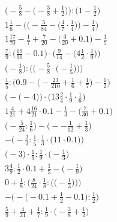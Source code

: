 \documentclass[8pt]{article}
\begin{document}
\begin{align}
\Big(-\frac{5}{8} - \big(-\frac{3}{8} + \frac{1}{2}\big)\Big) : \Big(1 - \frac{1}{2}\Big) \\
1\frac{1}{6} - \bigg(\Big(-\frac{5}{84} - \big(\frac{4}{7} \cdot \frac{1}{4}\big)\Big) - \frac{1}{4}\bigg) \\
1\frac{17}{70} - \frac{1}{7} + \frac{7}{20} - \big(\frac{3}{20} + 0.1\big) - \frac{1}{5} \\
\frac{7}{9} : \Big(\frac{19}{90} - 0.1\Big) \cdot \Big(\frac{9}{14} - \big(4\frac{1}{2} \cdot \frac{1}{9}\big)\Big) \\
\bigg(-\frac{1}{8}\bigg) : \bigg(\Big(-\frac{5}{8} \cdot \big(-\frac{1}{5}\big)\Big)\bigg) \\
\frac{1}{5} : \Big(0.9 - \big(-\frac{23}{210} + \frac{1}{6} + \frac{1}{7}\big) - \frac{1}{2}\Big) \\
\Big(-\big(-4\big)\Big) \cdot \Big(13\frac{2}{4} \cdot \frac{1}{9} \cdot \frac{1}{6}\Big) \\
1\frac{4}{21} + 4\frac{16}{21} \cdot 0.1 - \frac{1}{3} - \big(\frac{7}{30} + 0.1\big) \\
\big(-\frac{5}{24} : \frac{1}{6}\big) - \big(--\frac{1}{12} + \frac{1}{3}\big) \\
-\Big(-\frac{2}{3} : \frac{1}{5} : \frac{1}{3} \cdot \big(11 \cdot 0.1\big)\Big) \\
\big(-3\big) \cdot \frac{1}{9} : \frac{1}{9} \cdot \big(-\frac{1}{3}\big) \\
3\frac{4}{9} : \frac{1}{2} \cdot 0.1 + \frac{1}{5} - \big(-\frac{1}{9}\big) \\
0 + \frac{1}{8} : \bigg(\frac{8}{24} \cdot \frac{1}{8} : \Big(\big(-\frac{1}{3}\big)\Big)\bigg) \\
-\Big(-\big(-0.1 + \frac{1}{2} - 0.1\big) : \frac{1}{2}\Big) \\
\frac{5}{9} + \frac{4}{21} + \frac{1}{7} : \frac{1}{9} \cdot \big(-\frac{3}{8} + \frac{1}{2}\big)
\end{align}
\end{document}
